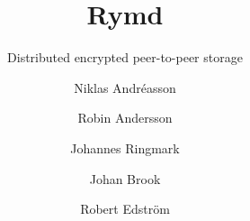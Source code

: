 \documentclass[bachelors,a4paper]{chalmers-thesis}
\title{Rymd}
\subtitle{Distributed encrypted peer-to-peer storage} %
\author{Niklas Andréasson \and Robin Andersson \and Johannes Ringmark \and Johan Brook \and Robert Edström}
\begin{document}
\makecoverpage
\tableofcontents



\end{document}
